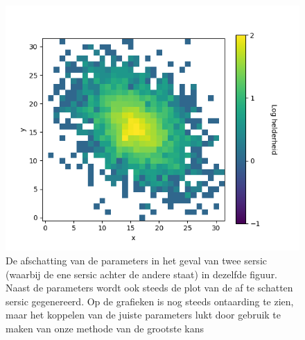 \begin{figure}
\begin{minipage}{0.98\linewidth}
        \includegraphics[width=0.95\linewidth]{Figures/figuur_2D_zonder_package_25_5_1_0.35_0.7853981633974483_6000.png}
    \end{minipage}
    \caption{De afschatting van de parameters in het geval van twee sersic (waarbij de ene sersic achter de andere staat) in dezelfde figuur. Naast de parameters wordt ook steeds de plot van de af te schatten sersic gegenereerd. Op de grafieken is nog steeds ontaarding te zien, maar het koppelen van de juiste parameters lukt door gebruik te maken van onze methode van de grootste kans}
    \label{fig: 2 sersic niet ontaard}
\end{figure}

